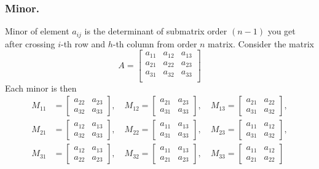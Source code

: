 \documentclass[../../../main.tex]{subfiles}
\begin{document}
\subsubsection{Minor.}
Minor of element $a_{ij}$ is the determinant of submatrix order $(n-1)$ you get after crossing $i$-th row and $h$-th column from order $n$ matrix.
Consider the matrix
\begin{equation*}
	A=\begin{bmatrix}
		a_{11} & a_{12} & a_{13} \\
		a_{21} & a_{22} & a_{23} \\
		a_{31} & a_{32} & a_{33} \\
	\end{bmatrix}
\end{equation*}
Each minor is then
\begin{align*}
	M_{11} & = \begin{bmatrix} a_{22} & a_{23} \\ a_{32} & a_{33} \end{bmatrix}, \quad
	M_{12} = \begin{bmatrix} a_{21} & a_{23} \\ a_{31} & a_{33} \end{bmatrix}, \quad
	M_{13} = \begin{bmatrix} a_{21} & a_{22} \\ a_{31} & a_{32} \end{bmatrix},         \\
	M_{21} & = \begin{bmatrix} a_{12} & a_{13} \\ a_{32} & a_{33} \end{bmatrix}, \quad
	M_{22} = \begin{bmatrix} a_{11} & a_{13} \\ a_{31} & a_{33} \end{bmatrix}, \quad
	M_{23} = \begin{bmatrix} a_{11} & a_{12} \\ a_{31} & a_{32} \end{bmatrix},         \\
	M_{31} & = \begin{bmatrix} a_{12} & a_{13} \\ a_{22} & a_{23} \end{bmatrix}, \quad
	M_{32} = \begin{bmatrix} a_{11} & a_{13} \\ a_{21} & a_{23} \end{bmatrix}, \quad
	M_{33} = \begin{bmatrix} a_{11} & a_{12} \\ a_{21} & a_{22} \end{bmatrix}
\end{align*}
\end{document}
